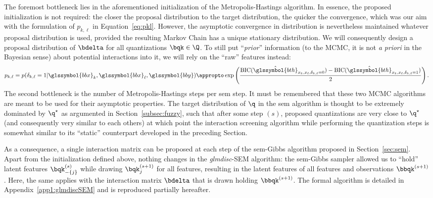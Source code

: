 The foremost bottleneck lies in the aforementioned initialization of the Metropolis-Hastings algorithm. In essence, the proposed initialization is not required: the closer the proposal distribution to the target distribution, the quicker the convergence, which was our aim with the formulation of $p_{k,\ell}$ in Equation~\eqref{eq:pkl}. However, the asymptotic convergence in distribution is nevertheless maintained whatever proposal distribution is used, provided the resulting Markov Chain has a unique stationary distribution. We will consequently design a proposal distribution of $\bdelta$ for all quantizations $\bqk \in \Q$. To still put ``\textit{prior}'' information (to the MCMC, it is not \textit{a priori} in the Bayesian sense) about potential interactions into it, we will rely on the ``raw'' features instead:
\begin{equation} \label{eq:pklnew}
p_{k,\ell} = p(\delta_{k,\ell} = 1 | \glssymbol{bbx}_k, \glssymbol{bbx}_\ell, \glssymbol{bby}) \appropto \exp \left( \frac{\text{BIC}(\hat{\glssymbol{bth}}_{x_k,x_\ell,\delta_{k,\ell}=0}) - \text{BIC}(\hat{\glssymbol{bth}}_{x_k,x_\ell,\delta_{k,\ell}=1})}{2} \right).
\end{equation}
The second bottleneck is the number of Metropolis-Hastings steps per \gls{sem} step. It must be remembered that these two MCMC algorithms are meant to be used for their asymptotic properties. The target distribution of $\q$ in the \gls{sem} algorithm is thought to be extremely dominated by $\q^\star$ as argumented in Section~\ref{subsec:fuzzy}, such that after some step $(s)$, proposed quantizations are very close to $\q^\star$ (and consequently very similar to each others) at which point the interaction screening algorithm while performing the quantization steps is somewhat similar to its ``static'' counterpart developed in the preceding Section.

As a consequence, a single interaction matrix can be proposed at each step of the \gls{sem}-Gibbs algorithm proposed in Section~\ref{sec:sem}. Apart from the initialization defined above, nothing changes in the \textit{glmdisc}-SEM algorithm: the \gls{sem}-Gibbs sampler allowed us to ``hold'' latent features $\bqk_{-\{j\}}^{(s)}$ while drawing $\bqk_{j}^{(s+1)}$ for all features, resulting in the latent features of all features and observations $\bbqk^{(s+1)}$. Here, the same applies with the interaction matrix $\bdelta$ that is drawn holding $\bbqk^{(s+1)}$. The formal algorithm is detailed in Appendix~\ref{app1:glmdiscSEM} and is reproduced partially hereafter.

